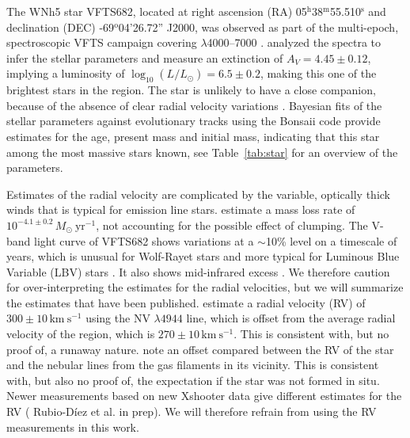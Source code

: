 \documentclass[apjl,twocolumn]{emulateapj}
\newcommand{\kms}{{\,\mathrm{km\ s^{-1}}}}
\DeclareRobustCommand{\Tabref}[1]{Table~\ref{#1}}
\begin{document}

The WNh5 star VFTS682, located at right ascension (RA)
05$^\mathrm{h}$38$^\mathrm{m}$55.510$^\mathrm{s}$  and declination
(DEC) \mbox{-69$^\mathrm{o}$04'26.72''} J2000, was observed as part of the multi-epoch, spectroscopic VFTS campaign covering $\lambda$4000--7000 \citep[][]{evans:11}. 
%
%
\citet{bestenlehner:11}  analyzed the spectra to infer the stellar parameters and measure an extinction of $A_V=4.45\pm0.12$, implying a luminosity of $\log_{10}(L/L_\odot) =  6.5\pm0.2$, making this one of the brightest stars in the region. The star is unlikely to have a close companion, because of the absence of clear radial velocity variations \citet{bestenlehner:11}.  Bayesian fits of the stellar parameters against evolutionary tracks \citep{brott:11, kohler:15} using the Bonsaii code \citep{schneider:17, schneider:18} provide estimates for the age, present mass and initial mass, indicating that this star among the most massive stars known, see \Tabref{tab:star} for an overview of the parameters.

Estimates of the radial velocity are complicated by the variable, optically thick winds that is typical for emission line stars. \citet{bestenlehner:11} estimate a mass loss rate of $10^{-4.1\pm0.2}\,M_\odot \ \mathrm{yr}^{-1}$, not accounting for the possible effect of clumping.  The V-band light curve of VFTS682  shows variations at a $\sim$10\% level on a timescale of years, which is unusual for Wolf-Rayet stars and more typical for Luminous Blue Variable (LBV) stars \citep{udalski:08, bestenlehner:11}. It also shows mid-infrared excess \citep{gruendl:09}.  We therefore caution for over-interpreting the estimates for the radial velocities, but we will summarize the estimates that have been published.  \citet{bestenlehner:11}  estimate a radial velocity (RV) of  $300\pm10\kms$ using the  N{\footnotesize V} $\lambda4944$ line, which is offset from the average radial velocity of the region, which is  $270\pm10\kms$. This is consistent with, but no proof of, a runaway nature.  \cite{bressert:12} note an offset compared between the RV of the star and the nebular lines from the gas filaments in its vicinity. This is consistent with, but also no proof of, the expectation if the star was not formed in situ.  Newer measurements based on new Xshooter data give different estimates for the RV ({\color{blue} Rubio-D{\' i}ez et al. in prep}). We will therefore refrain from using the RV measurements in this work. 
\end{document}
